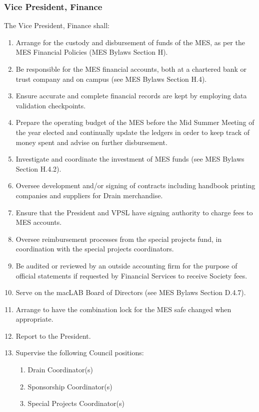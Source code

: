 \hypertarget{vice-president-finance}{%
 \subsubsection{Vice President,
  Finance}
 \label{vice-president-finance}}
The Vice President, Finance shall:

\begin{enumerate}
 \item
  Arrange for the custody and disbursement of funds of the MES, as per
  the MES Financial Policies (MES Bylaws Section H).
 \item
  Be responsible for the MES financial accounts, both at a chartered
  bank or trust company and on campus (see MES Bylaws Section H.4).
 \item
  Ensure accurate and complete financial records are kept by employing
  data validation checkpoints.
 \item
  Prepare the operating budget of the MES before the Mid Summer Meeting
  of the year elected and continually update the ledgers in order to
  keep track of money spent and advise on further disbursement.
 \item
  Investigate and coordinate the investment of MES funds (see MES Bylaws
  Section H.4.2).
 \item
  Oversee development and/or signing of contracts including handbook
  printing companies and suppliers for Drain merchandise.
 \item
  Ensure that the President and VPSL have signing authority to charge
  fees to MES accounts.
 \item
  Oversee reimbursement processes from the special projects fund, in
  coordination with the special projects coordinators.
 \item
  Be audited or reviewed by an outside accounting firm for the purpose
  of official statements if requested by Financial Services to receive
  Society fees.
 \item
  Serve on the macLAB Board of Directors (see MES Bylaws Section D.4.7).
 \item
  Arrange to have the combination lock for the MES safe changed when
  appropriate.
 \item
  Report to the President.
 \item
  Supervise the following Council positions:

  \begin{enumerate}
   \item
    Drain Coordinator(s)
   \item
    Sponsorship Coordinator(s)
   \item
    Special Projects Coordinator(s)

  \end{enumerate}
\end{enumerate}